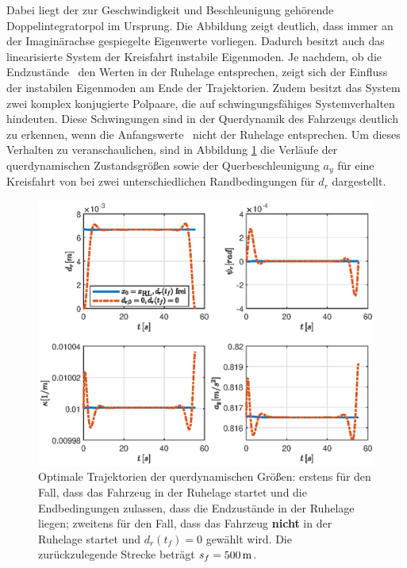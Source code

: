 Dabei liegt der zur Geschwindigkeit und Beschleunigung gehörende Doppelintegratorpol im Ursprung. Die Abbildung zeigt deutlich, dass immer an der Imaginärachse gespiegelte Eigenwerte vorliegen. Dadurch besitzt auch das linearisierte System der Kreisfahrt instabile Eigenmoden. Je nachdem, ob die Endzustände \zoftf~den Werten in der Ruhelage entsprechen, zeigt sich der Einfluss der instabilen Eigenmoden am Ende der Trajektorien. Zudem besitzt das System zwei komplex konjugierte Polpaare, die auf schwingungsfähiges Systemverhalten hindeuten. Diese Schwingungen sind in der Querdynamik des Fahrzeugs deutlich zu erkennen, wenn die Anfangswerte \zzero~nicht der Ruhelage entsprechen. Um dieses Verhalten zu veranschaulichen, sind in Abbildung \ref{fig:Querdyn_RL_ay} die Verläufe der querdynamischen Zustandsgrößen sowie der Querbeschleunigung $a_y$ für eine Kreisfahrt von  bei zwei unterschiedlichen Randbedingungen für $d_r$ dargestellt. 
\begin{figure}[h] 
	\centering
	\includegraphics[width=\linewidth]{./Bilder/Ergebnisse/Kreisfahrt/Mit_Querdynamik/Querdyn_RL_ay.eps}
	\caption{Optimale Trajektorien der querdynamischen Größen: erstens für den Fall, dass das Fahrzeug in der Ruhelage startet und die Endbedingungen zulassen, dass die Endzustände in der Ruhelage liegen; zweitens für den Fall, dass das Fahrzeug \textbf{nicht} in der Ruhelage startet und $d_r(t_f) = 0$ gewählt wird. Die zurückzulegende Strecke beträgt $s_f = 500\,\mathrm{m}$.}
	\label{fig:Querdyn_RL_ay}
\end{figure} 
